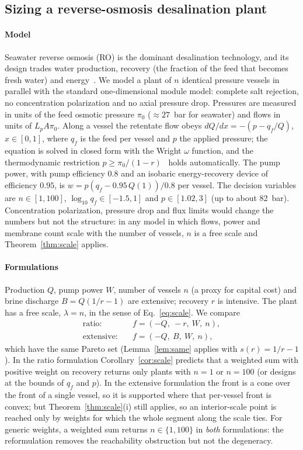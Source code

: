 \documentclass[journal]{IEEEtran}
\theoremstyle{remark}
\begin{document}
\subsection{Sizing a reverse-osmosis desalination plant}
\label{sec:ro}

\paragraph*{Model} Seawater reverse osmosis (RO) is the dominant desalination technology, and its
design trades water production, recovery (the fraction of the feed that becomes fresh water) and
energy~\cite{Elimelech2011,Zhu2009RO}. We model a plant of $n$ identical pressure vessels in parallel
with the standard one-dimensional module model: complete salt rejection, no concentration
polarization and no axial pressure drop. Pressures are measured in units of the feed osmotic pressure
$\pi_0$ ($\approx 27$~bar for seawater) and flows in units of $L_pA\pi_0$. Along a vessel the
retentate flow obeys $dQ/dx = -(p - q_f/Q)$, $x \in [0,1]$, where $q_f$ is the feed per vessel and $p$
the applied pressure; the equation is solved in closed form with the Wright $\omega$ function, and the
thermodynamic restriction $p \ge \pi_0/(1-r)$~\cite{Zhu2009RO} holds automatically. The pump power,
with pump efficiency $0.8$ and an isobaric energy-recovery device of efficiency $0.95$, is
$w = p(q_f - 0.95\,Q(1))/0.8$ per vessel. The decision variables are $n \in [1,100]$,
$\log_{10} q_f \in [-1.5, 1]$ and $p \in [1.02, 3]$ (up to about 82~bar). Concentration polarization,
pressure drop and flux limits would change the numbers but not the structure: in any model in which
flows, power and membrane count scale with the number of vessels, $n$ is a free scale and
Theorem~\ref{thm:scale} applies.

\paragraph*{Formulations} Production $Q$, pump power $W$, number of vessels $n$ (a proxy for capital
cost) and brine discharge $B = Q(1/r - 1)$ are extensive; recovery $r$ is intensive. The plant has a free
scale, $\lambda = n$, in the sense of Eq.~\eqref{eq:scale}. We compare
\begin{align}
\text{ratio:}\quad & f = (-Q,\ -r,\ W,\ n),\\
\text{extensive:}\quad & f = (-Q,\ B,\ W,\ n),
\end{align}
which have the same Pareto set (Lemma~\ref{lem:same} applies with $s(r) = 1/r - 1$). In the ratio
formulation Corollary~\ref{cor:scale} predicts that a weighted sum with positive weight on recovery
returns only plants with $n = 1$ or $n = 100$ (or designs at the bounds of $q_f$ and $p$). In the
extensive formulation the front is a cone over the front of a single vessel, so it is supported where
that per-vessel front is convex; but Theorem~\ref{thm:scale}(i) still applies, so an interior-scale
point is reached only by weights for which the whole segment along the scale ties. For generic weights,
a weighted sum returns $n \in \{1, 100\}$ in \emph{both} formulations: the reformulation removes the
reachability obstruction but not the degeneracy.
\end{document}
